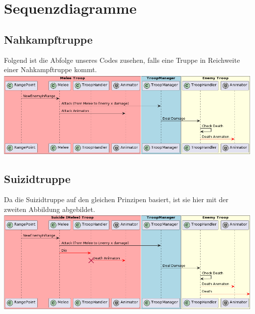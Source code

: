\section{Sequenzdiagramme}
\subsection{Nahkampftruppe}
Folgend ist die Abfolge unseres Codes zusehen, falls eine Truppe in Reichweite einer Nahkampftruppe kommt.\\
\includegraphics[width=15cm]{resources/MeleeAttacks.png} \\
\subsection{Suizidtruppe}
Da die Suizidtruppe auf den gleichen Prinzipen basiert, ist sie hier mit der zweiten Abbildung abgebildet. \\
\includegraphics[width=15cm]{resources/SuicideAttacks.png} \\


